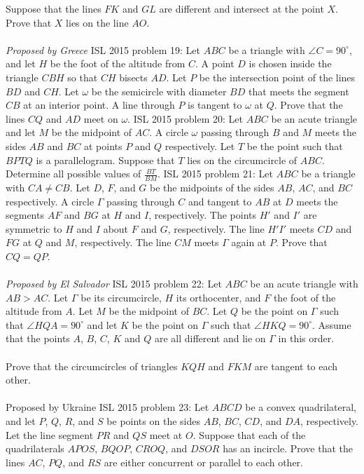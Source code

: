 Suppose that the lines $FK$ and $GL$ are different and intersect at the point $X$. Prove that $X$ lies on the line $AO$. \\\\
\textit{Proposed by Greece} 
ISL 2015 problem 19:  Let $ABC$ be a triangle with $\angle{C} = 90^{\circ}$, and let $H$ be the foot of the altitude from $C$. A point $D$ is chosen inside the triangle $CBH$ so that $CH$ bisects $AD$. Let $P$ be the intersection point of the lines $BD$ and $CH$. Let $\omega$ be the semicircle with diameter $BD$ that meets the segment $CB$ at an interior point. A line through $P$ is tangent to $\omega$ at $Q$. Prove that the lines $CQ$ and $AD$ meet on $\omega$. 
ISL 2015 problem 20:  Let $ABC$ be an acute triangle and let $M$ be the midpoint of $AC$. A circle $\omega$ passing through $B$ and $M$ meets the sides $AB$ and $BC$ at points $P$ and $Q$ respectively. Let $T$ be the point such that $BPTQ$ is a parallelogram. Suppose that $T$ lies on the circumcircle of $ABC$. Determine all possible values of $\frac{BT}{BM}$. 
ISL 2015 problem 21:  Let $ABC$ be a triangle with $CA \neq CB$. Let $D$, $F$, and $G$ be the midpoints of the sides $AB$, $AC$, and $BC$ respectively. A circle $\Gamma$ passing through $C$ and tangent to $AB$ at $D$ meets the segments $AF$ and $BG$ at $H$ and $I$, respectively. The points $H'$ and $I'$ are symmetric to $H$ and $I$ about $F$ and $G$, respectively. The line $H'I'$ meets $CD$ and $FG$ at $Q$ and $M$, respectively. The line $CM$ meets $\Gamma$ again at $P$. Prove that $CQ = QP$. \\\\
\textit{Proposed by El Salvador} 
ISL 2015 problem 22:  Let $ABC$ be an acute triangle with $AB > AC$. Let $\Gamma $ be its circumcircle, $H$ its orthocenter, and $F$ the foot of the altitude from $A$. Let $M$ be the midpoint of $BC$. Let $Q$ be the point on $\Gamma$ such that $\angle HQA = 90^{\circ}$ and let $K$ be the point on $\Gamma$ such that $\angle HKQ = 90^{\circ}$. Assume that the points $A$, $B$, $C$, $K$ and $Q$ are all different and lie on $\Gamma$ in this order. \\\\
Prove that the circumcircles of triangles $KQH$ and $FKM$ are tangent to each other. \\\\
Proposed by Ukraine 
ISL 2015 problem 23:  Let $ABCD$ be a convex quadrilateral, and let $P$, $Q$, $R$, and $S$ be points on the sides $AB$, $BC$, $CD$, and $DA$, respectively. Let the line segment $PR$ and $QS$ meet at $O$. Suppose that each of the quadrilaterals $APOS$, $BQOP$, $CROQ$, and $DSOR$ has an incircle. Prove that the lines $AC$, $PQ$, and $RS$ are either concurrent or parallel to each other. 
